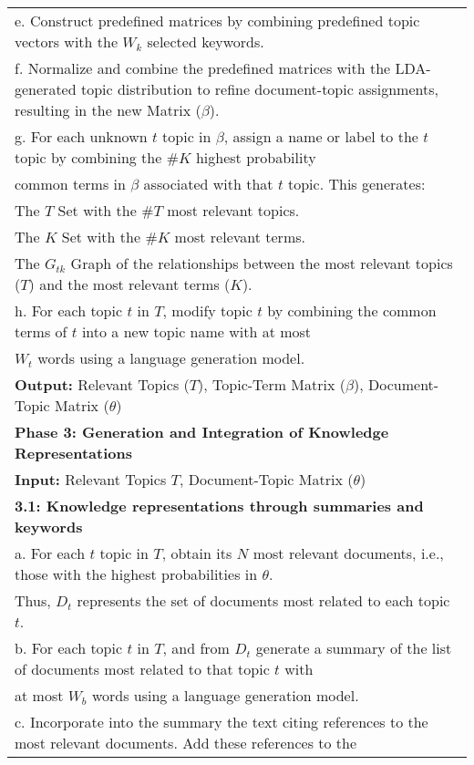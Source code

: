 \documentclass[runningheads]{llncs}
\begin{document}
\begin{figure*}[!h]
{\begin{tabular}{l}
			\quad e. Construct predefined matrices by combining predefined topic vectors with the $W_k$ selected keywords.\\
			\quad f. Normalize and combine the predefined matrices with the LDA-generated topic distribution to refine document-topic assignments, resulting in the new Matrix ($\beta$).\\
			\quad g. For each unknown $t$ topic in $\beta$, assign a name or label to the $t$ topic by combining the $\#K$ highest probability\\
			\quad \quad common terms in $\beta$ associated with that $t$ topic. This generates: \\
			\quad \quad The $T$ Set with the $\#T$ most relevant topics. \\
			\quad \quad The $K$ Set with the $\#K$ most relevant terms. \\
			\quad \quad The $G_{tk}$ Graph of the relationships between the most relevant topics ($T$) and the most relevant terms ($K$). \\
			\quad h. For each topic $t$ in $T$, modify topic $t$ by combining the common terms of $t$ into a new topic name with at most \\
			\quad \quad $W_{t}$ words using a language generation model.\\
			\quad \textbf{Output:} Relevant Topics ($T$), Topic-Term Matrix ($\beta$), Document-Topic Matrix ($\theta$) \\
			\textbf{Phase 3: Generation and Integration of Knowledge Representations} \\
			\quad \textbf{Input:} Relevant Topics $T$, Document-Topic Matrix ($\theta$) \\
			\quad \textbf{3.1: Knowledge representations through summaries and keywords}\\
			\quad \quad a. For each $t$ topic in $T$, obtain its $N$ most relevant documents, i.e., those with the highest probabilities in $\theta$. \\
			\quad \quad \quad Thus, $D_t$ represents the set of documents most related to each topic $t$.\\
			\quad \quad b. For each topic $t$ in $T$, and from $D_t$ generate a summary of the list of documents most related to that topic $t$ with \\
			\quad \quad \quad at most $W_b$ words using a language generation model. \\
			\quad \quad c. Incorporate into the summary the text citing references to the most relevant documents. Add these references to the \\ 

\end{tabular}}
\end{figure*}
\end{document}
